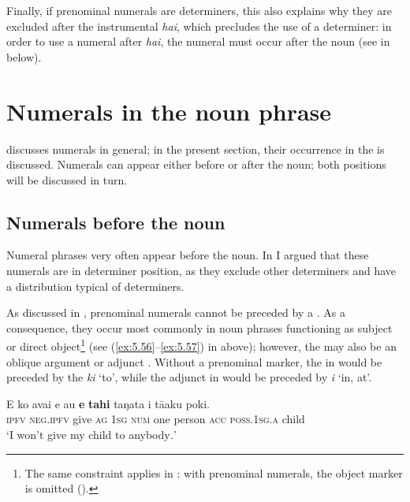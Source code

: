 Finally, if prenominal numerals are determiners, this also explains why they are excluded after the instrumental  \textit{hai}, which precludes the use of a determiner: in order to use a numeral after \textit{hai}, the numeral must occur after the noun (see  in  below).
\section{Numerals in the noun phrase}\label{sec:5.4}

 discusses numerals in general; in the present section, their occurrence in the  is discussed. Numerals can appear either before or after the noun; both positions will be discussed in turn.

\subsection{Numerals before the noun}\label{sec:5.4.1}

Numeral phrases very often appear before the noun. In  I argued that these numerals are in determiner position, as they exclude other determiners and have a distribution typical of determiners.

As discussed in , prenominal numerals cannot be preceded by a . As a consequence, they occur most commonly in noun phrases functioning as subject or direct object\footnote{\label{fn:258}The same constraint applies in : with prenominal numerals, the object marker is omitted (\citealt[184]{LazardPeltzer2000}).} (see (\ref{ex:5.56}–\ref{ex:5.57}) in  above); however, the  may also be an oblique argument  or adjunct . Without a prenominal marker, the  in  would be preceded by the  \textit{ki} ‘to’, while the adjunct  in  would be preceded by \textit{{\ꞌ}i} ‘in, at’.

\ea\label{ex:5.61}
\gll E ko {\ꞌ}avai e au \textbf{e} \textbf{tahi} taŋata i tā{\ꞌ}aku poki. \\
\textsc{ipfv} \textsc{neg.ipfv} give \textsc{ag} \textsc{1sg} \textsc{num} one person \textsc{acc} \textsc{poss.1sg.a} child \\

\glt 
‘I won’t give my child to anybody\textit{.}’ \textstyleExampleref{[R229.069]} 
\z

